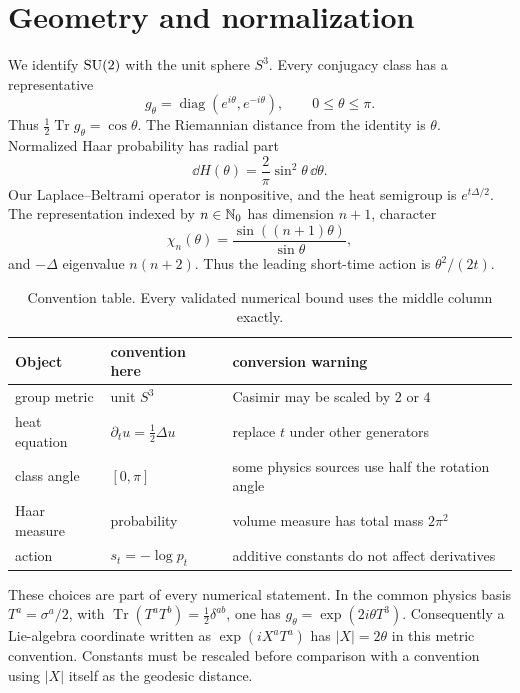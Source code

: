 \section{Geometry and normalization}\label{sec:conventions}

We identify $\mathrm{SU}(2)$ with the unit sphere $S^3$.  Every conjugacy class has a
representative
\[
 g_\theta=\operatorname{diag}(e^{i\theta},e^{-i\theta}),
 \qquad 0\le\theta\le\pi.
\]
Thus $\tfrac12\operatorname{Tr}g_\theta=\cos\theta$.  The Riemannian distance
from the identity is $\theta$.  Normalized Haar
probability has radial part
\begin{equation}\label{eq:haar-radial}
 \dd H(\theta)=\frac{2}{\pi}\sin^2\theta\,\dd\theta.
\end{equation}
Our Laplace--Beltrami operator is nonpositive, and the heat semigroup is
$e^{t\Delta/2}$.  The representation indexed by $n\in\mathbb{N}_0$ has dimension
$n+1$, character
\[
 \chi_n(\theta)=\frac{\sin((n+1)\theta)}{\sin\theta},
\]
and $-\Delta$ eigenvalue $n(n+2)$.  Thus the leading short-time action is
$\theta^2/(2t)$.

\begin{table}[ht]
\centering
\begin{tabular}{lll}
\toprule
Object & convention here & conversion warning \\
\midrule
group metric & unit $S^3$ & Casimir may be scaled by $2$ or $4$ \\
heat equation & $\partial_tu=\tfrac12\Delta u$ & replace $t$ under other generators \\
class angle & $[0,\pi]$ & some physics sources use half the rotation angle \\
Haar measure & probability & volume measure has total mass $2\pi^2$ \\
action & $s_t=-\log p_t$ & additive constants do not affect derivatives \\
\bottomrule
\end{tabular}
\caption{Convention table.  Every validated numerical bound uses the middle
column exactly.}\label{tab:conventions}
\end{table}

These choices are part of every numerical statement.  In the common physics
basis $T^a=\sigma^a/2$, with
$\operatorname{Tr}(T^aT^b)=\tfrac12\delta^{ab}$, one has
$g_\theta=\exp(2i\theta T^3)$.  Consequently a Lie-algebra coordinate written
as $\exp(iX^aT^a)$ has $|X|=2\theta$ in this metric convention.  Constants
must be rescaled before comparison with a convention using $|X|$ itself as
the geodesic distance.
